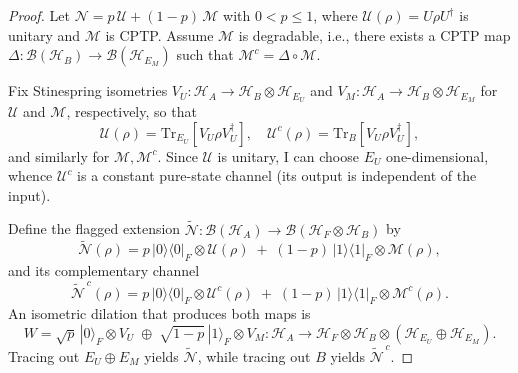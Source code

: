 \documentclass[11pt]{article}
\theoremstyle{plain}
\theoremstyle{definition}
\numberwithin{equation}{section}
\begin{document}
\begin{proof}
Let $\mathcal N = p\,\mathcal U + (1-p)\,\mathcal M$ with $0<p\le 1$, where $\mathcal U(\rho)=U\rho U^\dagger$ is unitary and $\mathcal M$ is CPTP. Assume $\mathcal M$ is degradable, i.e., there exists a CPTP map $\Delta:\mathcal B(\mathcal H_B)\to \mathcal B(\mathcal H_{E_M})$ such that $\mathcal M^c=\Delta\circ \mathcal M$.

Fix Stinespring isometries $V_U:\mathcal H_A\!\to\!\mathcal H_B\!\otimes\!\mathcal H_{E_U}$ and $V_M:\mathcal H_A\!\to\!\mathcal H_B\!\otimes\!\mathcal H_{E_M}$ for $\mathcal U$ and $\mathcal M$, respectively, so that
\[
\mathcal U(\rho)=\mathrm{Tr}_{E_U}[V_U\rho V_U^\dagger],\quad \mathcal U^c(\rho)=\mathrm{Tr}_B[V_U\rho V_U^\dagger],
\]
and similarly for $\mathcal M,\mathcal M^c$. Since $\mathcal U$ is unitary, I can choose $E_U$ one-dimensional, whence $\mathcal U^c$ is a constant pure-state channel (its output is independent of the input).

Define the flagged extension $\widetilde{\mathcal N}:\mathcal B(\mathcal H_A)\!\to\!\mathcal B(\mathcal H_F\!\otimes\!\mathcal H_B)$ by
\[
\widetilde{\mathcal N}(\rho)= p\,|0\rangle\!\langle 0|_F\!\otimes\!\mathcal U(\rho) \;+\; (1-p)\,|1\rangle\!\langle 1|_F\!\otimes\!\mathcal M(\rho),
\]
and its complementary channel
\[
\widetilde{\mathcal N}^{\,c}(\rho)= p\,|0\rangle\!\langle 0|_F\!\otimes\!\mathcal U^c(\rho) \;+\; (1-p)\,|1\rangle\!\langle 1|_F\!\otimes\!\mathcal M^c(\rho).
\]
An isometric dilation that produces both maps is
\[
W=\sqrt{p}\,|0\rangle_F\!\otimes V_U \;\oplus\; \sqrt{1-p}\,|1\rangle_F\!\otimes V_M:
\mathcal H_A\to \mathcal H_F\!\otimes\!\mathcal H_B\!\otimes\!(\mathcal H_{E_U}\oplus\mathcal H_{E_M}).
\]
Tracing out $E_U\oplus E_M$ yields $\widetilde{\mathcal N}$, while tracing out $B$ yields $\widetilde{\mathcal N}^{\,c}$.


\end{proof}
\end{document}
